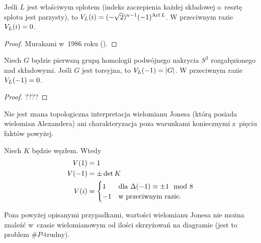 \begin{proposition}
    Jeśli $L$ jest właściwym splotem (indeks zaczepienia każdej składowej o~resztę splotu jest parzysty), to $V_L(i) = (-\sqrt 2)^{n-1}(-1)^{\operatorname{Arf} L}$.
    W przeciwnym razie $V_L(i) = 0$.
\end{proposition}

\begin{proof}
%
    Murakami w~1986 roku (\cite{murakami86}).
\end{proof}

\begin{proposition}
    Niech $G$ będzie pierwszą grupą homologii podwójnego nakrycia $S^3$ rozgałęzionego nad składowymi.
    Jeśli $G$ jest torsyjna, to $V_L(-1) = |G|$.
    W przeciwnym razie $V_L(-1) = 0$.
\end{proposition}

\begin{proof}
    ???? %
\end{proof}

Nie jest znana topologiczna interpretacja wielomianu Jonesa (którą posiada wielomian Alexandera) ani charakteryzacja poza warunkami koniecznymi z~pięciu faktów powyżej.

\begin{corollary}
    Niech $K$ będzie węzłem.
    Wtedy
    \begin{align}
        V(1) & = 1 \\
        V(-1) & = \pm \det K \\
        V(i) & = \begin{cases}
            1 & \text{dla } \Delta(-1) \equiv \pm 1 \mod 8 \\
            -1 & \text{w przeciwnym razie.}
        \end{cases}
    \end{align}
\end{corollary}

Poza powyżej opisanymi przypadkami, wartości wielomianu Jonesa nie można znaleźć w~czasie wielomianowym od ilości skrzyżowań na diagramie (jest to problem $\#P$-trudny).





